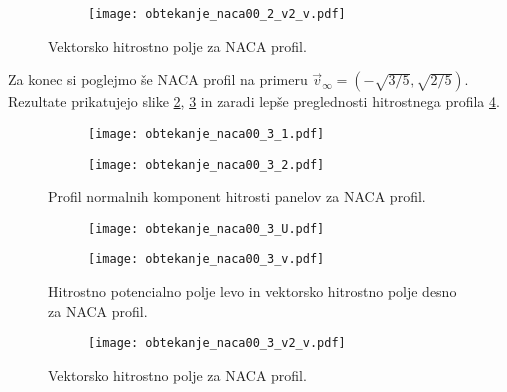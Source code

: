 \documentclass[12pt,a4paper]{article}
\begin{document}
\begin{figure}[H]
    \centering
    \begin{subfigure}[b]{0.8\textwidth}  			
        \texttt{[image: obtekanje\_naca00\_2\_v2\_v.pdf]}
    \end{subfigure}
    \caption{ Vektorsko hitrostno polje za NACA profil.} \label{fig:slika24}
\end{figure}

Za konec si poglejmo še NACA profil na primeru $\vec{v}_{\infty}=(-\sqrt{3/5},\sqrt{2/5})$. Rezultate prikatujejo slike \ref{fig:slika25}, \ref{fig:slika26} in zaradi lepše preglednosti hitrostnega profila \ref{fig:slika27}.

\begin{figure}[H]
    \centering
    \begin{subfigure}[b]{0.45\textwidth}  			
        \texttt{[image: obtekanje\_naca00\_3\_1.pdf]}
    \end{subfigure}
    \begin{subfigure}[b]{0.45\textwidth}  			
        \texttt{[image: obtekanje\_naca00\_3\_2.pdf]}
    \end{subfigure}
    \caption{Profil normalnih komponent hitrosti panelov za NACA profil.} \label{fig:slika25}
\end{figure}

\begin{figure}[H]
    \centering
    \begin{subfigure}[b]{0.45\textwidth}  			
        \texttt{[image: obtekanje\_naca00\_3\_U.pdf]}
    \end{subfigure}
    \begin{subfigure}[b]{0.45\textwidth}  			
        \texttt{[image: obtekanje\_naca00\_3\_v.pdf]}
    \end{subfigure}
    \caption{Hitrostno potencialno polje levo in vektorsko hitrostno polje desno za NACA profil.} \label{fig:slika26}
\end{figure}


\begin{figure}[H]
    \centering
    \begin{subfigure}[b]{0.8\textwidth}  			
        \texttt{[image: obtekanje\_naca00\_3\_v2\_v.pdf]}
    \end{subfigure}
    \caption{ Vektorsko hitrostno polje za NACA profil.} \label{fig:slika27}
\end{figure}
\end{document}
